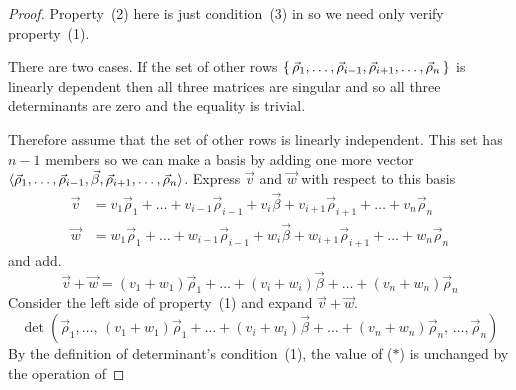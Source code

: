 \begin{proof}
Property~(2) here is just condition~(3) in 
so we need only verify property~(1).

There are two cases.
If the set of other rows
\(
  \mbox{$\{\,\vec{\rho}_1,\dots,\vec{\rho}_{i-1},\vec{\rho}_{i+1},
       \dots,\vec{\rho}_n\,\}$} 
\)
is linearly dependent then all three matrices are singular and so all
three determinants are zero and the equality is trivial.

Therefore assume that the set of other rows is linearly independent.
This set has $n-1$ members so we can make a basis by 
adding one more vector
$\langle\vec{\rho}_1,\dots,\vec{\rho}_{i-1},\vec{\beta},
               \vec{\rho}_{i+1},\dots,\vec{\rho}_n\rangle$.
Express $\vec{v}$ and $\vec{w}$ with respect to this basis
\begin{align*}
  \vec{v} &=v_1\vec{\rho}_1+\dots+v_{i-1}\vec{\rho}_{i-1}+v_i\vec{\beta}
            +v_{i+1}\vec{\rho}_{i+1}+\dots+v_n\vec{\rho}_n                \\
  \vec{w} &= w_1\vec{\rho}_1+\dots+w_{i-1}\vec{\rho}_{i-1}+w_i\vec{\beta}
            +w_{i+1}\vec{\rho}_{i+1}+\dots+w_n\vec{\rho}_n
\end{align*}
and add.
\begin{equation*}
  \vec{v}+\vec{w}
  =
  (v_1+w_1)\vec{\rho}_1+\dots+(v_i+w_i)\vec{\beta}
            +\dots+(v_n+w_n)\vec{\rho}_n 
\end{equation*}
Consider the left side of property~(1) and expand $\vec{v}+\vec{w}$.
\begin{equation*}
    \det (\vec{\rho}_1,\dots,\,(v_1+w_1)\vec{\rho}_1+\dots+(v_i+w_i)\vec{\beta}
            +\dots+(v_n+w_n)\vec{\rho}_n,\,\dots,\vec{\rho}_n) 
   \tag{*}
\end{equation*}
By the definition of determinant's condition~(1), the value of 
($*$) %
is unchanged by the operation of 

\end{proof}
